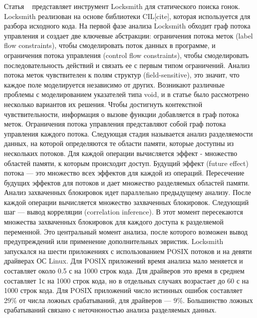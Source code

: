 Статья ~\cite{Pratikakis:2011} представляет инструмент Locksmith для статического поиска гонок.
Locksmith реализован на основе библиотеки CIL[cite], которая используется для разбора исходного кода.
На первой фазе анализа Locksmith обходит граф потока управления и создает две ключевые абстракции: ограничения потока меток (label flow constraints), чтобы смоделировать поток данных в программе, и ограничения потока управления (control flow constraints), чтобы смоделировать последовательность действий и связать ее с первым типом ограничений. Анализ потока меток чувствителен к полям структур (field-sensitive), это значит, что каждое поле моделируется независимо от других. Возникают различные проблемы с моделированием указателей типа void, и в статье было рассмотрено несколько вариантов их решения. Чтобы достигнуть контекстной чувствительности, информация о вызове функции добавляется в граф потока меток. Ограничения потока управления представляют собой граф потока управления каждого потока.
Следующая стадия называется анализ разделяемости данных, на которой определяются те области памяти, которые доступны из нескольких потоков. Для каждой операции вычисляется эффект - множество областей памяти, к которым происходит доступ. Будущий эффект (future effect) потока — это множество всех эффектов для каждой из операций. Пересечение будущих эффектов для потоков и дает множество разделяемых областей памяти.
Анализ захваченных блокировок идет параллельно предыдущему анализу. После каждой операции вычисляется множество захваченных блокировок.
Следующий шаг — вывод корреляции (correlation inference). В этот момент пересекаются множества захваченных блокировок для каждого доступа к разделяемой переменной. Это центральный момент анализа, после которого возможен вывод предупреждений или применение дополнительных эвристик.
Locksmith запускался на шести приложениях с использованием POSIX потоков и на девяти драйверах ОС Linux. Для POSIX приложений время анализа мало меняется и составляет около 0.5 с на 1000 строк кода. Для драйверов это время в среднем составляет 1с на 1000 строк кода, но в отдельных случаях возрастает до 60 с на 1000 строк кода. Для POSIX приложений число истинных ошибок составляет 29\% от числа ложных срабатываний, для драйверов — 9\%. Большинство ложных срабатываний связано с неточноностью анализа разделяемых данных.

